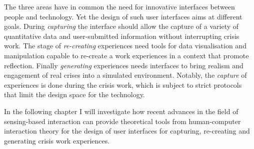 The three areas have in common the need for innovative interfaces between people and technology. Yet the design of such user interfaces aims at different goals. During \emph{capturing} the interface should allow the capture of a variety of quantitative data and user-submitted information without interrupting crisis work. The stage of \emph{re-creating} experiences need tools for data visualisation and manipulation capable to re-create a work experiences in a context that promote reflection. Finally \emph{generating} experiences needs interfaces to bring realism and engagement of real crises into a simulated environment. Notably, the \emph{capture} of experiences is done during the crisis work, which is subject to strict protocols that limit the design space for the technology.

In the following chapter I will investigate how recent advances in the field of sensing-based interaction can provide theoretical tools from human-computer interaction theory for the design of user interfaces for capturing, re-creating and generating crisis work experiences. 
